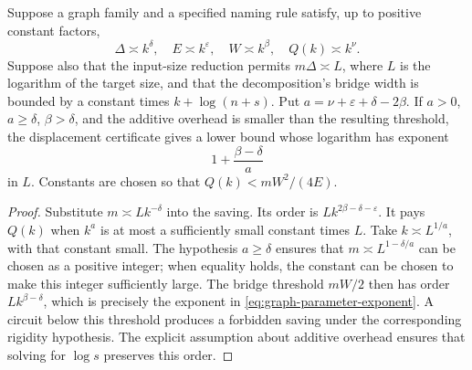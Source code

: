 \begin{proposition}\label{prop:parameter-exponent}
Suppose a graph family and a specified naming rule satisfy, up to positive constant factors,
\[
 \Delta\asymp k^\delta,\quad E\asymp k^\varepsilon,
 \quad W\asymp k^\beta,\quad Q(k)\asymp k^\nu.
\]
Suppose also that the input-size reduction permits $m\Delta\asymp L$, where $L$ is the logarithm of the target size, and that the decomposition's bridge width is bounded by a constant times $k+\log(n+s)$. Put $a=\nu+\varepsilon+\delta-2\beta$. If $a>0$, $a\geq\delta$, $\beta>\delta$, and the additive overhead is smaller than the resulting threshold, the displacement certificate gives a lower bound whose logarithm has exponent
\begin{equation}\label{eq:graph-parameter-exponent}
 1+\frac{\beta-\delta}{a}
\end{equation}
in $L$. Constants are chosen so that $Q(k)<mW^2/(4E)$.
\end{proposition}
\begin{proof}
Substitute $m\asymp Lk^{-\delta}$ into the saving. Its order is $Lk^{2\beta-\delta-\varepsilon}$. It pays $Q(k)$ when $k^a$ is at most a sufficiently small constant times $L$. Take $k\asymp L^{1/a}$, with that constant small. The hypothesis $a\geq\delta$ ensures that $m\asymp L^{1-\delta/a}$ can be chosen as a positive integer; when equality holds, the constant can be chosen to make this integer sufficiently large. The bridge threshold $mW/2$ then has order $Lk^{\beta-\delta}$, which is precisely the exponent in \eqref{eq:graph-parameter-exponent}. A circuit below this threshold produces a forbidden saving under the corresponding rigidity hypothesis. The explicit assumption about additive overhead ensures that solving for $\log s$ preserves this order.
\end{proof}

